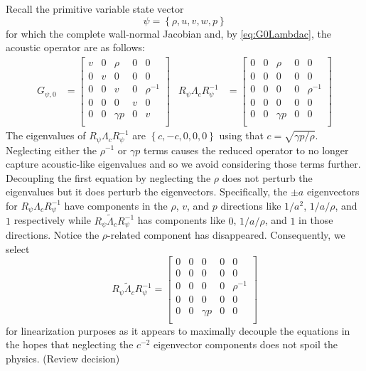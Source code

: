 \documentclass[letterpaper,11pt,nointlimits,reqno]{amsart}
\begin{document}
Recall the primitive variable state vector
\begin{equation}
  \psi = \left\{\rho, u, v, w, p\right\}
\end{equation}
for which the complete wall-normal Jacobian and, by \eqref{eq:G0Lambdac}, the
acoustic operator are as follows:
\begin{align}
 G_{\psi,0} &=
 \begin{bmatrix}
   v  &  0  &  \rho       & 0 &  0          \\
   0  &  v  &  0          & 0 &  0          \\
   0  &  0  &  v          & 0 &  \rho^{-1}  \\
   0  &  0  &  0          & v &  0          \\
   0  &  0  &  \gamma{}p  & 0 &  v          \\
 \end{bmatrix}
&
 R_\psi \Lambda_c R_\psi^{-1} &=
 \begin{bmatrix}
   0  &  0  &  \rho       & 0 &  0          \\
   0  &  0  &  0          & 0 &  0          \\
   0  &  0  &  0          & 0 &  \rho^{-1}  \\
   0  &  0  &  0          & 0 &  0          \\
   0  &  0  &  \gamma{}p  & 0 &  0          \\
 \end{bmatrix}
\end{align}
The eigenvalues of $R_\psi \Lambda_c R_\psi^{-1}$ are $\left\{c, -c, 0, 0,
0\right\}$ using that $c=\sqrt{\gamma p / \rho}$.  Neglecting either the
$\rho^{-1}$ or $\gamma p$ terms causes the reduced operator to no longer
capture acoustic-like eigenvalues and so we avoid considering those terms
further.  Decoupling the first equation by neglecting the $\rho$ does not
perturb the eigenvalues but it does perturb the eigenvectors.  Specifically,
the $\pm{}a$ eigenvectors for $R_\psi \Lambda_c R_\psi^{-1}$ have components in
the $\rho$, $v$, and $p$ directions like $1/a^2$, $1/a/\rho$, and $1$
respectively while $R_\psi \tilde\Lambda_c R_\psi^{-1}$ has components like
$0$, $1/a/\rho$, and $1$ in those directions.  Notice the $\rho$-related
component has disappeared.  Consequently, we select
\begin{equation}\label{eq:approxprim}
 R_\psi \tilde\Lambda_c R_\psi^{-1} =
 \begin{bmatrix}
   0  &  0  &  0          & 0 &  0          \\
   0  &  0  &  0          & 0 &  0          \\
   0  &  0  &  0          & 0 &  \rho^{-1}  \\
   0  &  0  &  0          & 0 &  0          \\
   0  &  0  &  \gamma{}p  & 0 &  0          \\
 \end{bmatrix}
\end{equation}
for linearization purposes as it appears to maximally decouple the equations in
the hopes that neglecting the $c^{-2}$ eigenvector components does not spoil
the physics. {\color{red}(Review decision)}
\end{document}
